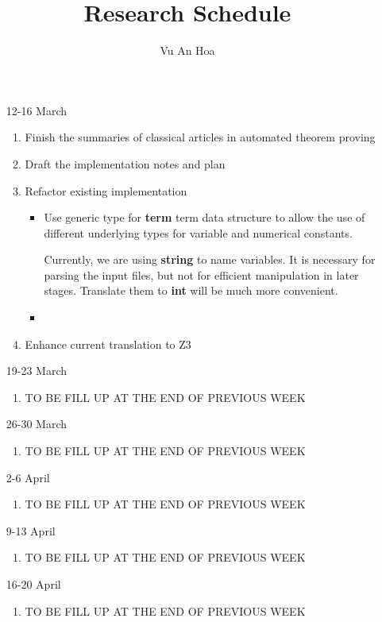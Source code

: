 \documentclass{article}
\title{Research Schedule}
\author{Vu An Hoa}
\begin{document}
\maketitle

\begin{enumerate}

\item [12-16 March]

\begin{enumerate}
\item Finish the summaries of classical articles in automated theorem proving
\item Draft the implementation notes and plan
\item Refactor existing implementation
\begin{itemize}
\item Use generic type for \textbf{term} term data structure to allow the use of different underlying types for variable and numerical constants.

Currently, we are using \textbf{string} to name variables. It is necessary for parsing the input files, but not for efficient manipulation in later stages. Translate them to \textbf{int} will be much more convenient.
\item 
\end{itemize}
\item Enhance current translation to Z3
\end{enumerate}

\item [19-23 March]

\begin{enumerate}
\item TO BE FILL UP AT THE END OF PREVIOUS WEEK
\end{enumerate}

\item [26-30 March]
\begin{enumerate}
\item TO BE FILL UP AT THE END OF PREVIOUS WEEK
\end{enumerate}

\item [2-6 April]
\begin{enumerate}
\item TO BE FILL UP AT THE END OF PREVIOUS WEEK
\end{enumerate}

\item [9-13 April]
\begin{enumerate}
\item TO BE FILL UP AT THE END OF PREVIOUS WEEK
\end{enumerate}

\item [16-20 April]
\begin{enumerate}
\item TO BE FILL UP AT THE END OF PREVIOUS WEEK
\end{enumerate}

\end{enumerate}
\end{document}
